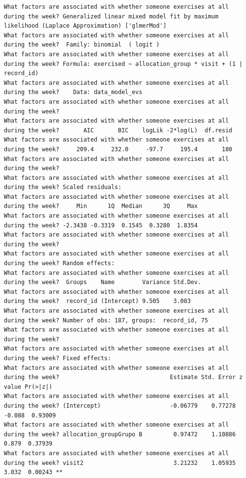 \documentclass[
  12pt,
]{article}
\begin{document}
\begin{verbatim}
What factors are associated with whether someone exercises at all during the week? Generalized linear mixed model fit by maximum likelihood (Laplace Approximation) ['glmerMod']
What factors are associated with whether someone exercises at all during the week?  Family: binomial  ( logit )
What factors are associated with whether someone exercises at all during the week? Formula: exercised ~ allocation_group * visit + (1 | record_id)
What factors are associated with whether someone exercises at all during the week?    Data: data_model_evs
What factors are associated with whether someone exercises at all during the week? 
What factors are associated with whether someone exercises at all during the week?       AIC       BIC    logLik -2*log(L)  df.resid 
What factors are associated with whether someone exercises at all during the week?     209.4     232.0     -97.7     195.4       180 
What factors are associated with whether someone exercises at all during the week? 
What factors are associated with whether someone exercises at all during the week? Scaled residuals: 
What factors are associated with whether someone exercises at all during the week?     Min      1Q  Median      3Q     Max 
What factors are associated with whether someone exercises at all during the week? -2.3438 -0.3319  0.1545  0.3280  1.8354 
What factors are associated with whether someone exercises at all during the week? 
What factors are associated with whether someone exercises at all during the week? Random effects:
What factors are associated with whether someone exercises at all during the week?  Groups    Name        Variance Std.Dev.
What factors are associated with whether someone exercises at all during the week?  record_id (Intercept) 9.505    3.083   
What factors are associated with whether someone exercises at all during the week? Number of obs: 187, groups:  record_id, 75
What factors are associated with whether someone exercises at all during the week? 
What factors are associated with whether someone exercises at all during the week? Fixed effects:
What factors are associated with whether someone exercises at all during the week?                                Estimate Std. Error z value Pr(>|z|)   
What factors are associated with whether someone exercises at all during the week? (Intercept)                    -0.06779    0.77278  -0.088  0.93009   
What factors are associated with whether someone exercises at all during the week? allocation_groupGrupo B         0.97472    1.10886   0.879  0.37939   
What factors are associated with whether someone exercises at all during the week? visit2                          3.21232    1.05935   3.032  0.00243 **

\end{verbatim}
\end{document}

